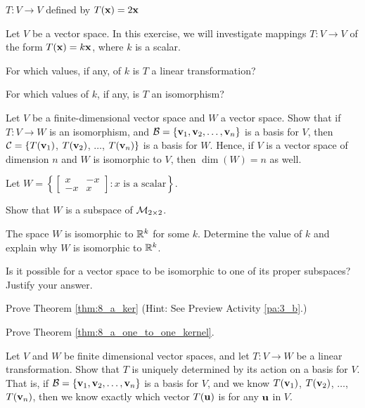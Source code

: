      \item $T: V \to V$ defined by $T(\mathbf{x}) = 2\mathbf{x}$ 

    \ea

\item Let $V$ be a vector space. In this exercise, we will investigate mappings $T: V \to V$ of the form $T(\mathbf{x}) = k\mathbf{x}$, where $k$ is a scalar. 
	\ba
	\item For which values, if any, of $k$ is $T$ a linear transformation?


	\item For which values of $k$, if any, is $T$ an isomorphism?

	\ea

\item \label{ex:8_a_isomorphic_dimension} Let $V$ be a finite-dimensional vector space and $W$ a vector space. Show that if $T: V \to W$ is an isomorphism, and $\mathcal{B} = \{\mathbf{v}_1, \mathbf{v}_2, \ldots, \mathbf{v}_n\}$ is a basis for $V$, then $\mathcal{C} = \{T(\mathbf{v}_1)$, $T(\mathbf{v}_2)$, $\ldots$, $T(\mathbf{v}_n)\}$ is a basis for $W$. Hence, if $V$ is a vector space of dimension $n$ and $W$ is isomorphic to $V$, then $\dim(W) = n$ as well. 

	

\item Let $W = \left\{ \left[ \begin{array}{rr} x & -x \\ -x & x \end{array} \right] : x \text{ is a scalar}\right\}$.
    \ba
    \item Show that $W$ is a subspace of $\mathcal{M}_{2 \times 2}$. 

    \item The space $W$ is isomorphic to $\mathbb{R}^k$ for some $k$. Determine the value of $k$ and explain why $W$ is isomorphic to $\mathbb{R}^k$. 

    \ea


	
\item  Is it possible for a vector space to be isomorphic to one of its proper subspaces?  Justify your answer.

\item Prove Theorem \ref{thm:8_a_ker} (Hint: See Preview Activity \ref{pa:3_b}.) 

\item Prove Theorem \ref{thm:8_a_one_to_one_kernel}. 

\item Let $V$ and $W$ be finite dimensional vector spaces, and let $T : V \to W$ be a linear transformation. Show that $T$ is uniquely determined by its action on a basis for $V$. That is, if $\mathcal{B} = \{\mathbf{v}_1, \mathbf{v}_2, \ldots, \mathbf{v}_n\}$ is a basis for $V$, and we know $T(\mathbf{v}_1)$, $T(\mathbf{v}_2)$, $\ldots$, $T(\mathbf{v}_n)$, then we know exactly which vector $T(\mathbf{u})$ is for any $\mathbf{u}$ in $V$. 

